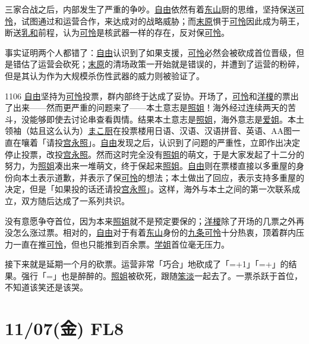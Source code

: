 三家合战之后，内部发生了严重的争吵。\uline{自由}依然有着\uline{东山}厨的思维，坚持保送\uline{可怜}，试图通过和运营合作，来达成对的战略威胁；而\uline{末原}惧于\uline{可怜}因此成为萌王，断送\uline{乳和}前程，认为\uline{可怜}是核武器一样的存在，反对保\uline{可怜}。

事实证明两个人都错了：\uline{自由}认识到了如果支援，\uline{可怜}必然会被砍成首位晋级，但是错估了运营会砍死；\uline{末原}的清场政策一开始就是错误的，并遭到了运营的粉碎，但是其认为作为大规模杀伤性武器的威力则被验证了。

1106 \uline{自由}坚持为\uline{可怜}投票，群内部终于达成了妥协。开场了，\uline{可怜}和\uline{洋榎}的票出了出来——然而更严重的问题来了——本土意志是\uline{照姐}！海外经过连续两天的苦斗，没能够即使去讨论串查看舆情。结果本土意志是\uline{照姐}，海外意志是\uline{爱姐}。本土领袖（姑且这么认为）\uline{まこ厨}在投票楼用日语、汉语、汉语拼音、英语、AA图一直在嚷着「请投\uline{宫永照}」。\uline{自由}发现之后，认识到了问题的严重性，立即作出决定停止投票，改投\uline{宫永照}。然而这时完全没有\uline{照姐}的萌文，于是大家发起了十二分的努力，为\uline{照姐}凑出来一堆萌文，终于保起来\uline{照姐}。\uline{自由}则在票楼直接以多重屋的身份向本土表示道歉，并表示了保\uline{可怜}的想法；本土做出了回应，表示支持多重屋的决定，但是「如果投的话还请投\uline{宫永照}」。这样，海外与本土之间的第一次联系成立，双方随后达成了一系列共识。

没有意愿争夺首位，因为本来\uline{照姐}就不是预定要保的；\uline{洋榎}除了开场的几票之外再没怎么涨过票。相对的，\uline{自由}对于有着\uline{东山}身份的\uline{九条可怜}十分热衷，顶着群内压力一直在推\uline{可怜}，但也只能推到百余票。\uline{学姐}首位毫无压力。

接下来就是延期一个月的砍票。运营非常「巧合」地砍成了「=+1」「=+」的结果。强行「=」也是醉醉的。\uline{照姐}被砍死，跟随\uline{笨淡}一起去了。一票杀跃于首位，不知道该笑还是该哭。

\section{11/07(金) FL8}


